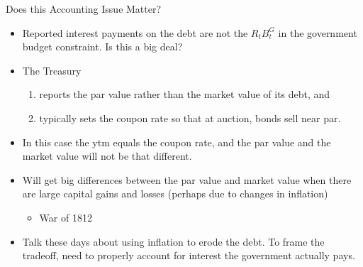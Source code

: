 \documentclass[professionalfonts,small]{beamer}
\begin{document}
\begin{frame}{Does this Accounting Issue Matter?}
\footnotesize
\begin{itemize}

\item Reported interest payments on the debt are not the $R_t B^G_{t}$ in the government budget constraint.
Is this a big deal?

\medskip

\item The Treasury
\begin{enumerate}
\footnotesize
\item reports the par value rather than the market value of its debt, and
\item typically sets the coupon rate so that at auction, bonds sell near par.
\end{enumerate}

\medskip

\item In this case the ytm equals the coupon rate, and the par value and the market value will not be that different.

\end{itemize}
\end{frame}
\begin{frame}

\begin{itemize}

\item Will get big differences between the par value and market value when there are large capital gains and losses (perhaps due to changes in inflation)
\begin{itemize}
\item War of 1812
\end{itemize}

\bigskip

\item Talk these days about using inflation to erode the debt. To frame the tradeoff, need to properly account for interest the government actually pays.

\end{itemize}

\end{frame}
\end{document}
